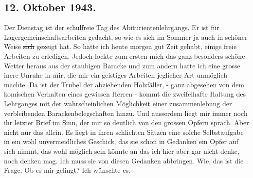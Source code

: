 \subsection{12. Oktober 1943.}

Der Dienstag ist der schulfreie Tag des Abiturientenlehrgangs.
Er ist f\"{u}r Lagergemeinschaftsarbeiten gedacht, so wie es sich im Sommer ja auch in sch\"{o}ner Weise \st{sich} gezeigt hat.
So h\"{a}tte ich heute morgen gut Zeit gehabt, einige freie Arbeiten zu erledigen.
Jedoch lockte zum ersten mich das ganz besonders sch\"{o}ne Wetter heraus aus der staubigen Baracke und zum andern hatte ich eine grosse inere Unruhe in mir, die mir ein geistiges Arbeiten jeglicher Art unm\"{o}glich machte.
Da ist der Trubel der abziehenden Holzf\"{a}ller, - ganz abgesehen von dem komischen Verhalten eines gewissen Herren - kommt die zweifelhafte Haltung des Lehrganges mit der wahrscheinlichen M\"{o}glichkeit einer zusammenlebung der verbleibenden Barackenbelegschaften hinzu.
Und ausserdem liegt mir immer noch ihr letzter Brief im Sinn, der mir so deutlich von den grossen Opfern sprach.
Aber nicht nur das allein.
Es liegt in ihren schlichten S\"{a}tzen eine solche Selbstaufgabe in ein wohl unvermeidliches Geschick, das sie schon in Gedanken ein Opfer auf sich nimmt, das wohl m\"{o}glich sein k\"{o}nnte an das ich hier aber gar nicht denke, noch denken mag.
Ich muss sie von diesen Gedanken abbringen.
Wie, das ist die Frage.
Ob es mir gelingt?
Ich w\"{u}nschte es.

\clearpage
